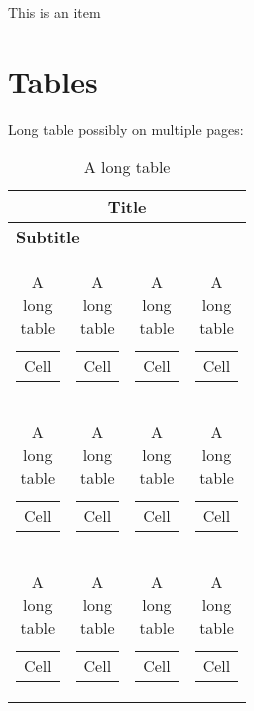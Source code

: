 \begin{basedescript}{%
  \desclabelstyle{\multilinelabel}
  \desclabelwidth{3cm}}

\item[This is an item] \lipsum[25] 

\end{basedescript}

\newpage


\section{Tables}

Long table possibly on multiple pages:

\begin{longtable}{|l|l|l|l|}

\caption{A long table}\label{table:long_table}\\

\hline

\multicolumn{4}{|c|}{{\textbf{Title}}} \\ \hline
\multicolumn{4}{|l|}{\textbf{Subtitle}} \\ \hline

\begin{tabular}[c]{@{}l@{}} Cell \end{tabular} &
\begin{tabular}[c]{@{}l@{}} Cell \end{tabular} &
\begin{tabular}[c]{@{}l@{}} Cell \end{tabular} & 
\begin{tabular}[c]{@{}l@{}} Cell \end{tabular} \\ \hline

\begin{tabular}[c]{@{}l@{}} Cell \end{tabular} &
\begin{tabular}[c]{@{}l@{}} Cell \end{tabular} &
\begin{tabular}[c]{@{}l@{}} Cell \end{tabular} & 
\begin{tabular}[c]{@{}l@{}} Cell \end{tabular} \\ \hline

\begin{tabular}[c]{@{}l@{}} Cell \end{tabular} &
\begin{tabular}[c]{@{}l@{}} Cell \end{tabular} &
\begin{tabular}[c]{@{}l@{}} Cell \end{tabular} & 
\begin{tabular}[c]{@{}l@{}} Cell \end{tabular} \\ \hline


\end{longtable}
